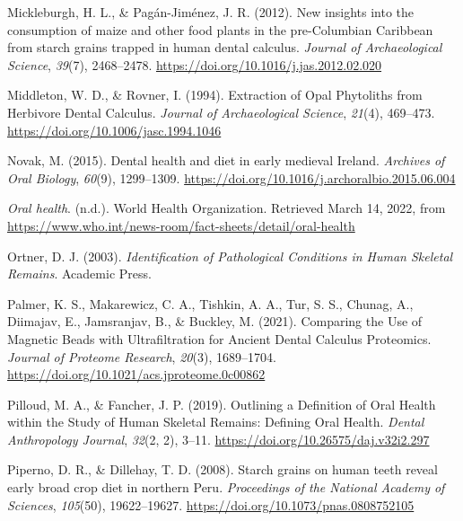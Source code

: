 \documentclass[
  letterpaper,
]{book}
\newlength{\cslhangindent}
\newlength{\cslentryspacingunit} %
\newenvironment{CSLReferences}[2] %
 {%
  \setlength{\parindent}{0pt}
  \ifodd #1
  \let\oldpar\par
  \def\par{\hangindent=\cslhangindent\oldpar}
  \fi
  \setlength{\parskip}{#2\cslentryspacingunit}
 }%
 {}
\begin{document}
\begin{CSLReferences}{1}{0}
\leavevmode{}%
Mickleburgh, H. L., \& Pagán-Jiménez, J. R. (2012). New insights into
the consumption of maize and other food plants in the pre-{Columbian
Caribbean} from starch grains trapped in human dental calculus.
\emph{Journal of Archaeological Science}, \emph{39}(7), 2468--2478.
\url{https://doi.org/10.1016/j.jas.2012.02.020}

\leavevmode{}%
Middleton, W. D., \& Rovner, I. (1994). Extraction of {Opal Phytoliths}
from {Herbivore Dental Calculus}. \emph{Journal of Archaeological
Science}, \emph{21}(4), 469--473.
\url{https://doi.org/10.1006/jasc.1994.1046}

\leavevmode{}%
Novak, M. (2015). Dental health and diet in early medieval {Ireland}.
\emph{Archives of Oral Biology}, \emph{60}(9), 1299--1309.
\url{https://doi.org/10.1016/j.archoralbio.2015.06.004}

\leavevmode{}%
\emph{Oral health}. (n.d.). {World Health Organization}. Retrieved March
14, 2022, from
\url{https://www.who.int/news-room/fact-sheets/detail/oral-health}

\leavevmode{}%
Ortner, D. J. (2003). \emph{Identification of {Pathological Conditions}
in {Human Skeletal Remains}}. {Academic Press}.

\leavevmode{}%
Palmer, K. S., Makarewicz, C. A., Tishkin, A. A., Tur, S. S., Chunag,
A., Diimajav, E., Jamsranjav, B., \& Buckley, M. (2021). Comparing the
{Use} of {Magnetic Beads} with {Ultrafiltration} for {Ancient Dental
Calculus Proteomics}. \emph{Journal of Proteome Research}, \emph{20}(3),
1689--1704. \url{https://doi.org/10.1021/acs.jproteome.0c00862}

\leavevmode{}%
Pilloud, M. A., \& Fancher, J. P. (2019). Outlining a {Definition} of
{Oral Health} within the {Study} of {Human Skeletal Remains}: {Defining
Oral Health}. \emph{Dental Anthropology Journal}, \emph{32}(2, 2),
3--11. \url{https://doi.org/10.26575/daj.v32i2.297}

\leavevmode{}%
Piperno, D. R., \& Dillehay, T. D. (2008). Starch grains on human teeth
reveal early broad crop diet in northern {Peru}. \emph{Proceedings of
the National Academy of Sciences}, \emph{105}(50), 19622--19627.
\url{https://doi.org/10.1073/pnas.0808752105}


\end{CSLReferences}
\end{document}
